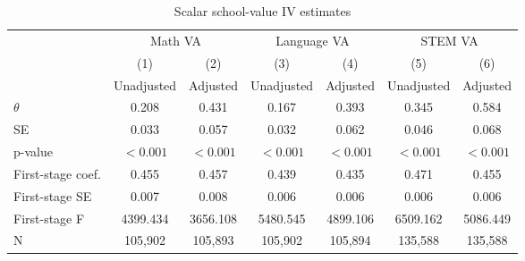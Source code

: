 \begin{table}[!htbp]
\centering
\caption{Scalar school-value IV estimates}
\label{tab:scalar_school_value_iv_main_results}
\begin{tabular}{lcccccc}
\toprule
 & \multicolumn{2}{c}{Math VA} & \multicolumn{2}{c}{Language VA} & \multicolumn{2}{c}{STEM VA} \\
\cmidrule(lr){2-3} \cmidrule(lr){4-5} \cmidrule(lr){6-7}
 & (1) & (2) & (3) & (4) & (5) & (6) \\
 & Unadjusted & Adjusted & Unadjusted & Adjusted & Unadjusted & Adjusted \\
\midrule
$\theta$ & 0.208 & 0.431 & 0.167 & 0.393 & 0.345 & 0.584 \\
SE & 0.033 & 0.057 & 0.032 & 0.062 & 0.046 & 0.068 \\
p-value & $<0.001$ & $<0.001$ & $<0.001$ & $<0.001$ & $<0.001$ & $<0.001$ \\
\midrule
First-stage coef. & 0.455 & 0.457 & 0.439 & 0.435 & 0.471 & 0.455 \\
First-stage SE & 0.007 & 0.008 & 0.006 & 0.006 & 0.006 & 0.006 \\
First-stage F & 4399.434 & 3656.108 & 5480.545 & 4899.106 & 6509.162 & 5086.449 \\
N & 105,902 & 105,893 & 105,902 & 105,894 & 135,588 & 135,588 \\
\bottomrule
\end{tabular}
\end{table}
